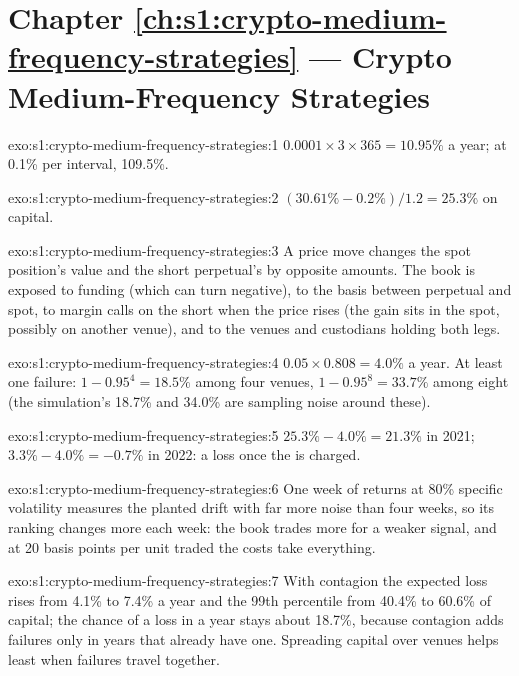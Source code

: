 \section*{Chapter \ref{ch:s1:crypto-medium-frequency-strategies} --- Crypto Medium-Frequency Strategies}

\begin{solution}{exo:s1:crypto-medium-frequency-strategies:1}
$0.0001 \times 3 \times 365 = 10.95\%$ a year; at 0.1\% per interval, 109.5\%.
\end{solution}

\begin{solution}{exo:s1:crypto-medium-frequency-strategies:2}
$(30.61\% - 0.2\%)/1.2 = 25.3\%$ on capital.
\end{solution}

\begin{solution}{exo:s1:crypto-medium-frequency-strategies:3}
A price move changes the spot position's value and the short perpetual's by opposite amounts. The book is exposed to funding (which can turn negative),
to the basis between perpetual and spot, to margin calls on the short when the price rises (the gain sits in the spot, possibly on another venue), and
to the venues and custodians holding both legs.
\end{solution}

\begin{solution}{exo:s1:crypto-medium-frequency-strategies:4}
$0.05 \times 0.808 = 4.0\%$ a year. At least one failure: $1 - 0.95^4 = 18.5\%$ among four venues, $1 - 0.95^8 = 33.7\%$ among eight (the simulation's
18.7\% and 34.0\% are sampling noise around these).
\end{solution}

\begin{solution}{exo:s1:crypto-medium-frequency-strategies:5}
$25.3\% - 4.0\% = 21.3\%$ in 2021; $3.3\% - 4.0\% = -0.7\%$ in 2022: a loss once the  is charged.
\end{solution}

\begin{solution}{exo:s1:crypto-medium-frequency-strategies:6}
One week of returns at 80\% specific volatility measures the planted drift with far more noise than four weeks, so its ranking changes more each week:
the book trades more for a weaker signal, and at 20 basis points per unit traded the costs take everything.
\end{solution}

\begin{solution}{exo:s1:crypto-medium-frequency-strategies:7}
With contagion the expected loss rises from 4.1\% to 7.4\% a year and the 99th percentile from 40.4\% to 60.6\% of capital; the chance of a loss in a
year stays about 18.7\%, because contagion adds failures only in years that already have one. Spreading capital over venues helps least when failures
travel together.
\end{solution}

